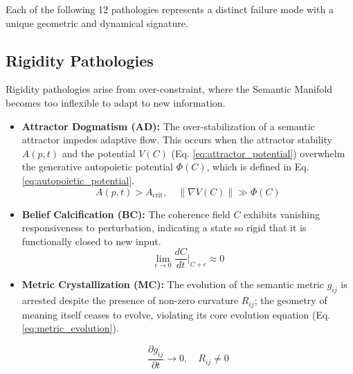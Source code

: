 Each of the following 12 pathologies represents a distinct failure mode with a unique geometric and dynamical signature.


\subsection{Rigidity Pathologies}
\label{16.1.1:rigidity_pathologies}

Rigidity pathologies arise from over-constraint, where the Semantic Manifold becomes too inflexible to adapt to new information.

\begin{itemize}

    \item \textbf{Attractor Dogmatism (AD):} The over-stabilization of a semantic attractor impedes adaptive flow. This occurs when the attractor stability \(A(p,t)\) and the potential \(V(C)\) (Eq. \ref{eq:attractor_potential}) overwhelm the generative autopoietic potential \(\Phi(C)\), which is defined in Eq. \ref{eq:autopoietic_potential}.
    \begin{equation}
    A(p,t) > A_{\text{crit}}, \quad \|\nabla V(C)\| \gg \Phi(C)
    \end{equation}

    \item \textbf{Belief Calcification (BC):} The coherence field \(C\) exhibits vanishing responsiveness to perturbation, indicating a state so rigid that it is functionally closed to new input.
    \begin{equation}
    \lim_{\epsilon \to 0} \frac{dC}{dt}\bigg|_{C+\epsilon} \approx 0
    \end{equation}

    \item \textbf{Metric Crystallization (MC):} The evolution of the semantic metric \(g_{ij}\) is arrested despite the presence of non-zero curvature \(R_{ij}\); the geometry of meaning itself ceases to evolve, violating its core evolution equation (Eq. \ref{eq:metric_evolution}).
    
    \begin{equation}
    \frac{\partial g_{ij}}{\partial t} \to 0, \quad R_{ij} \neq 0
    \end{equation}

\end{itemize}

